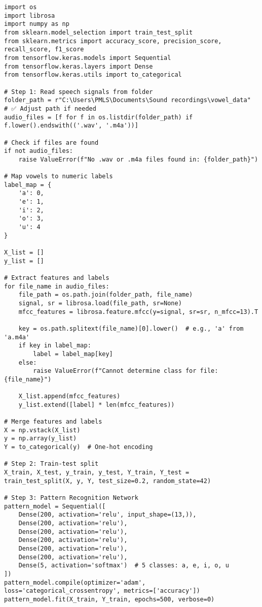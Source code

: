 \documentclass[a4paper,12pt]{article}
\begin{document}
\begin{verbatim}
import os
import librosa
import numpy as np
from sklearn.model_selection import train_test_split
from sklearn.metrics import accuracy_score, precision_score, recall_score, f1_score
from tensorflow.keras.models import Sequential
from tensorflow.keras.layers import Dense
from tensorflow.keras.utils import to_categorical

# Step 1: Read speech signals from folder
folder_path = r"C:\Users\PMLS\Documents\Sound recordings\vowel_data"  # ✅ Adjust path if needed
audio_files = [f for f in os.listdir(folder_path) if f.lower().endswith(('.wav', '.m4a'))]

# Check if files are found
if not audio_files:
    raise ValueError(f"No .wav or .m4a files found in: {folder_path}")

# Map vowels to numeric labels
label_map = {
    'a': 0,
    'e': 1,
    'i': 2,
    'o': 3,
    'u': 4
}

X_list = []
y_list = []

# Extract features and labels
for file_name in audio_files:
    file_path = os.path.join(folder_path, file_name)
    signal, sr = librosa.load(file_path, sr=None)
    mfcc_features = librosa.feature.mfcc(y=signal, sr=sr, n_mfcc=13).T

    key = os.path.splitext(file_name)[0].lower()  # e.g., 'a' from 'a.m4a'
    if key in label_map:
        label = label_map[key]
    else:
        raise ValueError(f"Cannot determine class for file: {file_name}")
    
    X_list.append(mfcc_features)
    y_list.extend([label] * len(mfcc_features))

# Merge features and labels
X = np.vstack(X_list)
y = np.array(y_list)
Y = to_categorical(y)  # One-hot encoding

# Step 2: Train-test split
X_train, X_test, y_train, y_test, Y_train, Y_test = train_test_split(X, y, Y, test_size=0.2, random_state=42)

# Step 3: Pattern Recognition Network
pattern_model = Sequential([
    Dense(200, activation='relu', input_shape=(13,)),
    Dense(200, activation='relu'),
    Dense(200, activation='relu'),
    Dense(200, activation='relu'),
    Dense(200, activation='relu'),
    Dense(200, activation='relu'),
    Dense(5, activation='softmax')  # 5 classes: a, e, i, o, u
])
pattern_model.compile(optimizer='adam', loss='categorical_crossentropy', metrics=['accuracy'])
pattern_model.fit(X_train, Y_train, epochs=500, verbose=0)


\end{verbatim}
\end{document}
